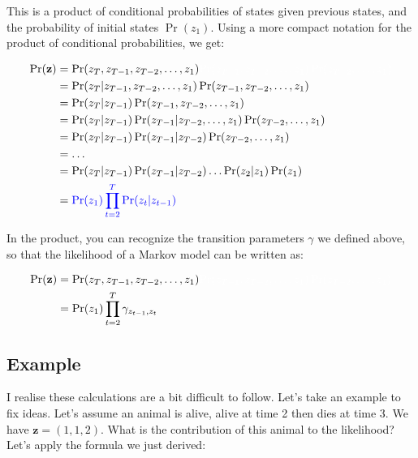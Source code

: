 \documentclass[
  12pt,
]{krantz}
\begin{document}
This is a product of conditional probabilities of states given previous states, and the probability of initial states \(\Pr(z_1)\). Using a more compact notation for the product of conditional probabilities, we get:

\begin{align*}
\Pr(\mathbf{z}) &= \Pr(z_T, z_{T-1}, z_{T-2}, \ldots, z_1) \color{white}{\Pr(z_{T-1}, z_{T-2},\ldots, z_1) \Pr(z_{T-2}, \ldots, z_1)}\\
                &= \Pr(z_T | z_{T-1}, z_{T-2},\ldots, z_1) \Pr(z_{T-1}, z_{T-2},\ldots, z_1) \\
                &= \Pr(z_T | z_{T-1}) \Pr(z_{T-1}, z_{T-2},\ldots, z_1) \\
                &= \Pr(z_T | z_{T-1}) \Pr(z_{T-1} | z_{T-2}, \ldots, z_1) \Pr(z_{T-2}, \ldots, z_1)\\
                &= \Pr(z_T | z_{T-1}) \Pr(z_{T-1} | z_{T-2}) \Pr(z_{T-2}, \ldots, z_1)\\
                &= \ldots \\
                &= \Pr(z_T | z_{T-1}) \Pr(z_{T-1} | z_{T-2}) \ldots \Pr(z_{2} | z_{1}) \Pr(z_{1})\\
                &= \color{blue}{\Pr(z_{1}) \prod_{t=2}^T{\Pr(z_{t} | z_{t-1})}}\\
\end{align*}

In the product, you can recognize the transition parameters \(\gamma\) we defined above, so that the likelihood of a Markov model can be written as:

\begin{align*}
\Pr(\mathbf{z}) &= \Pr(z_T, z_{T-1}, z_{T-2}, \ldots, z_1) \color{white}{\Pr(z_{T-1}, z_{T-2},\ldots, z_1) \Pr(z_{T-2}, \ldots, z_1)}\\
                &= \Pr(z_{1}) \prod_{t=2}^T{\gamma_{z_{t-1},z_{t}}}\\
\end{align*}

\hypertarget{example}{%
\subsection{Example}\label{example}}

I realise these calculations are a bit difficult to follow. Let's take an example to fix ideas. Let's assume an animal is alive, alive at time 2 then dies at time 3. We have \(\mathbf{z} = (1, 1, 2)\). What is the contribution of this animal to the likelihood? Let's apply the formula we just derived:
\end{document}
